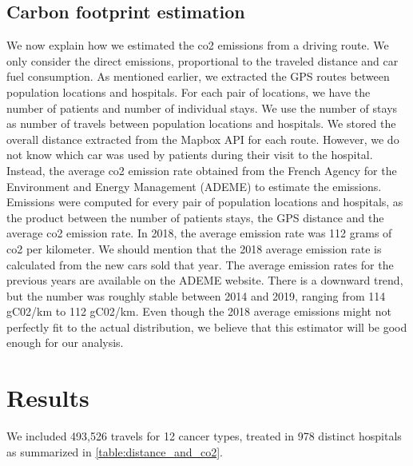 \subsection{Carbon footprint estimation}

We now explain how we estimated the \ac{co2} emissions from a driving route. We only consider the direct emissions, proportional to the traveled distance and car fuel consumption. As mentioned earlier, we extracted the GPS routes between population locations and hospitals. For each pair of locations, we have the number of patients and number of individual stays. We use the number of stays as number of travels between population locations and hospitals. We stored the overall distance extracted from the Mapbox API for each route. However, we do not know which car was used by patients during their visit to the hospital. Instead, the average \ac{co2} emission rate obtained from the French Agency for the Environment and Energy Management (ADEME) to estimate the emissions. Emissions were computed for every pair of population locations and hospitals, as the product between the number of patients stays, the GPS distance and the average \ac{co2} emission rate. In 2018, the average emission rate was 112 grams of \ac{co2} per kilometer. We should mention that the 2018 average emission rate is calculated from the new cars sold that year. The average emission rates for the previous years are available on the ADEME website. There is a downward trend, but the number was roughly stable between 2014 and 2019, ranging from 114 gC02/km to 112 gC02/km. Even though the 2018 average emissions might not perfectly fit to the actual distribution, we believe that this estimator will be good enough for our analysis.

\section{Results}

We included 493,526 travels for 12 cancer types, treated in 978 distinct hospitals as summarized in \cref{table:distance_and_co2}.

